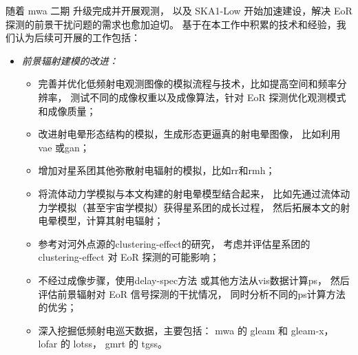 \begin{summary}
随着 \ac{mwa} 二期 \cite{wayth2018} 升级完成并开展观测，
以及 SKA1-Low 开始加速建设，解决 EoR 探测的前景干扰问题的需求也愈加迫切。
基于在本工作中积累的技术和经验，我们认为后续可开展的工作包括：
\begin{itemize}
\item \emph{前景辐射建模的改进：}
  \begin{itemize}
    \item 完善并优化低频射电观测图像的模拟流程与技术，比如提高空间和频率分辨率，
      测试不同的成像权重以及成像算法，针对 EoR 探测优化观测模式和成像质量；
    \item 改进射电晕形态结构的模拟，生成形态更逼真的射电晕图像，
      比如利用\ac{vae}\cite{kingma2013} 或\ac{gan}\cite{goodfellow2014}；
    \item 增加对星系团其他弥散射电辐射的模拟，比如\ac{rr}和\ac{rmh}；
    \item 将流体动力学模拟与本文构建的射电晕模型结合起来，
      比如先通过流体动力学模拟（甚至宇宙学模拟）获得星系团的成长过程，
      然后拓展本文的射电晕模型，计算其射电辐射；
    \item 参考对河外点源的\ac{clustering-effect}的研究，
      考虑并评估星系团的\ac{clustering-effect}\cite{delPopolo2005,fedeli2009}
      对 EoR 探测的可能影响；
    \item 不经过成像步骤，使用\ac{delay-spec}方法\cite{parsons2012}
      或其他方法从\ac{vis}数据计算\ac{ps}\cite{morales2019}，
      然后评估前景辐射对 EoR 信号探测的干扰情况，
      同时分析不同的\ac{ps}计算方法的优劣；
    \item 深入挖掘低频射电巡天数据，主要包括：
      \ac{mwa} 的 \ac{gleam}\cite{wayth2015,hurleyWalker2017}
      和 \ac{gleam-x}\cite{hurleyWalker2017prop}，
      \ac{lofar} 的 \ac{lotss}\cite{shimwell2017,shimwell2019}，
      \ac{gmrt} 的 \ac{tgss}\cite{intema2017}。
  \end{itemize}


\end{itemize}
\end{summary}
